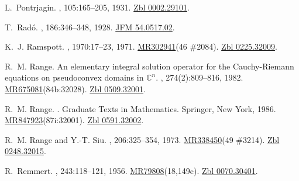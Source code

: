 \documentclass[11pt,a4paper, final, twoside]{article}
\numberwithin{equation}{section}
\begin{document}
\begin{appendices}
\begin{thebibliography}{100}
L.~Pontrjagin.
, 105:165--205, 1931.
\newblock \href{http://zbmath.org/?q=an:0002.29101}{Zbl 0002.29101}.

T.~Rad\'o.
, 186:346--348, 1928.
\newblock \href{http://zbmath.org/?q=an:54.0517.02}{JFM 54.0517.02}.

K.~J. Ramspott.
, 1970:17--23,
  1971.
\newblock \href{http://www.ams.org/mathscinet-getitem?mr=302941}{MR302941}(46
  \#2084). \href{http://zbmath.org/?q=an:0225.32009}{Zbl 0225.32009}.

R.~M. Range.
\newblock An elementary integral solution operator for the {C}auchy-{R}iemann
  equations on pseudoconvex domains in {$\mathbb C^n$}.
,
  274(2):809--816, 1982.
\newblock
  \href{http://www.ams.org/mathscinet-getitem?mr=675081}{MR675081}(84b:32028).
  \href{http://zbmath.org/?q=an:0509.32001}{Zbl 0509.32001}.

R.~M. Range.
.
\newblock Graduate Texts in Mathematics. Springer, New York, 1986.
\newblock
  \href{http://www.ams.org/mathscinet-getitem?mr=847923}{MR847923}(87i:32001).
  \href{http://zbmath.org/?q=an:0591.32002}{Zbl 0591.32002}.

R.~M. Range and Y.-T. Siu.
, 206:325--354, 1973.
\newblock \href{http://www.ams.org/mathscinet-getitem?mr=338450}{MR338450}(49
  \#3214). \href{http://zbmath.org/?q=an:0248.32015}{Zbl 0248.32015}.

R.~Remmert.
, 243:118--121, 1956.
\newblock
  \href{http://www.ams.org/mathscinet-getitem?mr=79808}{MR79808}(18,149c).
  \href{http://zbmath.org/?q=an:0070.30401}{Zbl 0070.30401}.


\end{thebibliography}
\end{appendices}
\end{document}
